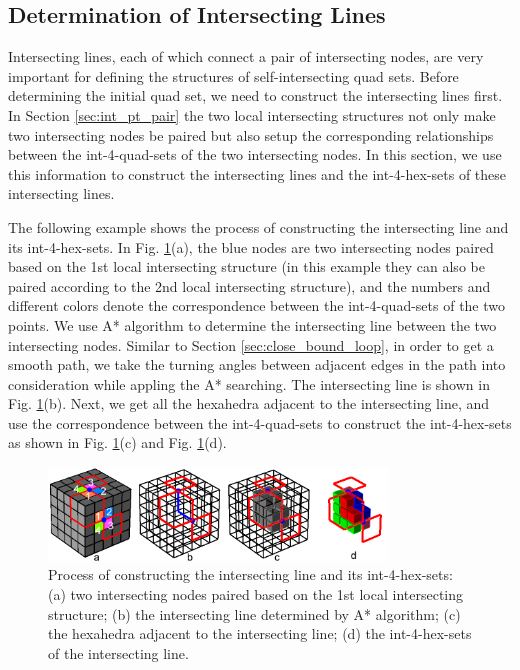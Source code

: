 \documentclass[final,5p,times,twocolumn]{elsarticle}
\begin{document}
\subsection{Determination of Intersecting Lines}
\label{sec:det_int_lines}
Intersecting lines, each of which connect a pair of intersecting nodes, are very important for defining the structures of self-intersecting quad sets. Before determining the initial quad set, we need to construct the intersecting lines first. In Section \ref{sec:int_pt_pair} the two local intersecting structures not only make two intersecting nodes be paired but also setup the corresponding relationships between the int-4-quad-sets of the two intersecting nodes. In this section, we use this information to construct the intersecting lines and the int-4-hex-sets of these intersecting lines.

The following example shows the process of constructing the intersecting line and its int-4-hex-sets. In Fig. \ref{fig:det_int_line}(a), the blue nodes are two intersecting nodes paired based on the 1st local intersecting structure (in this example they can also be paired according to the 2nd local intersecting structure), and the numbers and different colors denote the correspondence between the int-4-quad-sets of the two points. We use A* algorithm to determine the intersecting line between the two intersecting nodes. Similar to Section \ref{sec:close_bound_loop}, in order to get a smooth path, we take the turning angles between adjacent edges in the path into consideration while appling the A* searching. The intersecting line is shown in Fig. \ref{fig:det_int_line}(b). Next, we get all the hexahedra adjacent to the intersecting line, and use the correspondence between the int-4-quad-sets to construct the int-4-hex-sets as shown in Fig. \ref{fig:det_int_line}(c) and Fig. \ref{fig:det_int_line}(d).

\begin{figure}[htbp]
\begin{center}
\includegraphics[width=9cm]{figures/det_int_line.png}
\caption{Process of constructing the intersecting line and its int-4-hex-sets: (a) two intersecting nodes paired based on the 1st local intersecting structure; (b) the intersecting line determined by A* algorithm; (c) the hexahedra adjacent to the intersecting line; (d) the int-4-hex-sets of the intersecting line.}
\label{fig:det_int_line}
\end{center}
\end{figure}
\end{document}
